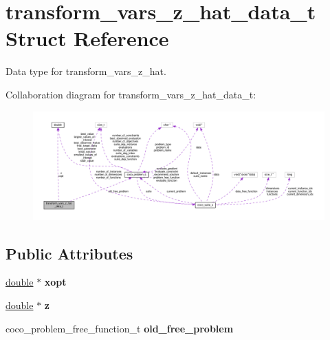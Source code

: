 \hypertarget{structtransform__vars__z__hat__data__t}{}\section{transform\+\_\+vars\+\_\+z\+\_\+hat\+\_\+data\+\_\+t Struct Reference}
\label{structtransform__vars__z__hat__data__t}


Data type for transform\+\_\+vars\+\_\+z\+\_\+hat.  




Collaboration diagram for transform\+\_\+vars\+\_\+z\+\_\+hat\+\_\+data\+\_\+t\+:\nopagebreak
\begin{figure}[H]
\begin{center}
\leavevmode
\includegraphics[width=350pt]{structtransform__vars__z__hat__data__t__coll__graph}
\end{center}
\end{figure}
\subsection*{Public Attributes}
\begin{DoxyCompactItemize}
\item 
\hyperlink{classdouble}{double} $\ast$ {\bfseries xopt}\hypertarget{structtransform__vars__z__hat__data__t_ac443db3714975e216bdeb963fded280f}{}\label{structtransform__vars__z__hat__data__t_ac443db3714975e216bdeb963fded280f}

\item 
\hyperlink{classdouble}{double} $\ast$ {\bfseries z}\hypertarget{structtransform__vars__z__hat__data__t_a0b8b2d9db44bbb15baf5fc2f5a8d5242}{}\label{structtransform__vars__z__hat__data__t_a0b8b2d9db44bbb15baf5fc2f5a8d5242}

\item 
coco\+\_\+problem\+\_\+free\+\_\+function\+\_\+t {\bfseries old\+\_\+free\+\_\+problem}\hypertarget{structtransform__vars__z__hat__data__t_a6e33bd8addfb65f3f3fdacdcbaf52e01}{}\label{structtransform__vars__z__hat__data__t_a6e33bd8addfb65f3f3fdacdcbaf52e01}

\end{DoxyCompactItemize}


